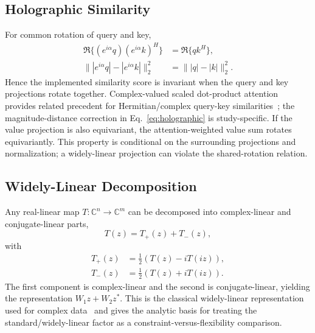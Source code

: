\subsection{Holographic Similarity}
For common rotation of query and key,
\begin{align}
\Re\{(e^{i\alpha}q)(e^{i\alpha}k)^H\}
&=\Re\{qk^H\},\\
\||e^{i\alpha}q|-|e^{i\alpha}k|\|_2^2
&=\||q|-|k|\|_2^2.
\end{align}
Hence the implemented similarity score is invariant when the query and key projections rotate together. Complex-valued scaled dot-product attention provides related precedent for Hermitian/complex query-key similarities~\cite{Eilers2023ComplexTransformer}; the magnitude-distance correction in Eq.~\eqref{eq:holographic} is study-specific. If the value projection is also equivariant, the attention-weighted value sum rotates equivariantly. This property is conditional on the surrounding projections and normalization; a widely-linear projection can violate the shared-rotation relation.

\subsection{Widely-Linear Decomposition}
Any real-linear map $T:\mathbb{C}^n\rightarrow\mathbb{C}^m$ can be decomposed into complex-linear and conjugate-linear parts,
\begin{equation}
T(z)=T_+(z)+T_-(z),
\end{equation}
with
\begin{align}
T_+(z)&=\tfrac12\left(T(z)-iT(iz)\right),\\
T_-(z)&=\tfrac12\left(T(z)+iT(iz)\right).
\end{align}
The first component is complex-linear and the second is conjugate-linear, yielding the representation $W_1z+W_2z^*$. This is the classical widely-linear representation used for complex data~\cite{Picinbono1995WidelyLinear} and gives the analytic basis for treating the standard/widely-linear factor as a constraint-versus-flexibility comparison.
